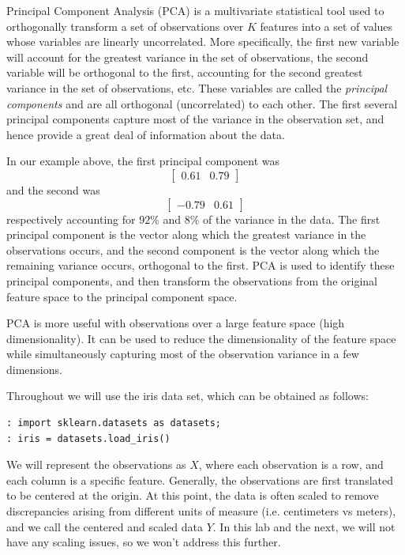 Principal Component Analysis (PCA) is a multivariate statistical tool used to orthogonally transform a set of observations over $K$ features into a set of values whose variables are linearly uncorrelated. More specifically, the first new variable will account for the greatest variance in the set of observations, the second variable will be orthogonal to the first, accounting for the second greatest variance in the set of observations, etc. These variables are called the \emph{principal components} and are all orthogonal (uncorrelated) to each other. The first several principal components capture most of the variance in the observation set, and hence provide a great deal of information about the data.

In our example above, the first principal component was \[\left[ \begin{array}{cc} 0.61 & 0.79 \end{array} \right] \]  and the second was \[\left[ \begin{array}{cc} -0.79 & 0.61 \end{array} \right] \] respectively accounting for $92\%$ and $8\%$ of the variance in the data. The first principal component is the vector along which the greatest variance in the observations occurs, and the second component is the vector along which the remaining variance occurs, orthogonal to the first. PCA is used to identify these principal components, and then transform the observations from the original feature space to the principal component space.

PCA is more useful with observations over a large feature space (high dimensionality). It can be used to reduce the dimensionality of the feature space while simultaneously capturing most of the observation variance in a few dimensions.

Throughout we will use the iris data set, which can be obtained as follows:
\begin{lstlisting}[style=python]
: import sklearn.datasets as datasets;
: iris = datasets.load_iris()
\end{lstlisting}

We will represent the observations as $X$, where each observation is a row, and each column is a specific feature. Generally, the observations are first translated to be centered at the origin. At this point, the data is often scaled to remove discrepancies arising from different units of measure (i.e. centimeters vs meters), and we call the centered and scaled data $Y$. In this lab and the next, we will not have any scaling issues, so we won't address this further. 

